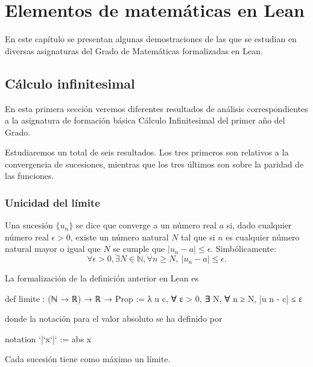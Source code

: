 \chapter{Elementos de matemáticas en Lean}

En este capítulo se presentan algunas demostraciones de las que se
estudian en diversas asignaturas del Grado de Matemáticas formalizadas en Lean.

\section{Cálculo infinitesimal}
En esta primera sección veremos diferentes resultados de análisis correspondientes a la asignatura de formación básica Cálculo Infinitesimal del primer año del Grado.

Estudiaremos un total de seis resultados. Los tres primeros son relativos a la convergencia de sucesiones, mientras que los tres últimos son sobre la paridad de las funciones.

\subsection{Unicidad del límite}

\begin{definicion}\label{limite}
	Una sucesión \(\{ u_n\} \) se dice que converge a un número real \(a\) si, dado cualquier número real \(\epsilon > 0\), existe un número natural \(N\) tal que si \(n\) es cualquier número natural mayor o igual que \(N\) se cumple que \(|u_n-a| \leq \epsilon\). Simbólicamente: 
	\begin{equation}
	\forall \epsilon >0, \exists N \in \mathbb{N}, \forall n \geq N, \ |u_n-a| \leq \epsilon.
	\end{equation}
\end{definicion}
\newpage 
La formalización de la definición anterior en Lean es
\begin{leancode}
def limite : (ℕ → ℝ) → ℝ → Prop :=
λ u c, ∀ ε > 0, ∃ N, ∀ n ≥ N, |u n - c| ≤ ε
\end{leancode}
donde la notación para el valor absoluto se ha definido por
\begin{leancode}
notation `|`x`|` := abs x
\end{leancode}

\begin{teorema}
Cada sucesión tiene como máximo un límite.
\end{teorema}

